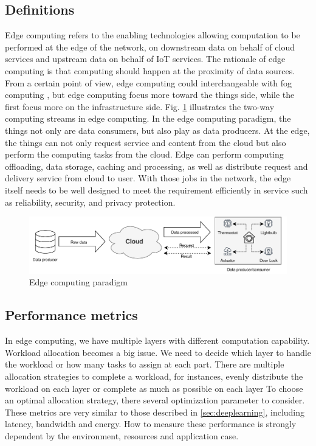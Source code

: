 \subsection{Definitions}
Edge computing refers to the enabling technologies allowing computation to be performed at the edge of the network, on downstream data on behalf of cloud services and upstream data on behalf of IoT services. The rationale of edge computing is that computing should happen at the proximity of data sources. From a certain point of view, edge computing could interchangeable with fog computing \cite{openfog}, but edge computing focus more toward the things side, while the first focus more on the infrastructure side. Fig. \ref{fig:edgearch} illustrates the two-way computing streams in edge computing. In the edge computing paradigm, the things not only are data consumers, but also play as data producers. At the edge, the things can not only request service and content from the cloud but also perform the computing tasks from the cloud. Edge can perform computing offloading, data storage, caching and processing, as well as distribute request and delivery service from cloud to user. With those jobs in the network, the edge itself needs to be well designed to meet the requirement efficiently in service such as reliability, security, and privacy protection.

\begin{figure}
	\includegraphics[width=\linewidth]{images/edgearch}
	\caption{Edge computing paradigm}
	\label{fig:edgearch}
\end{figure}


\subsection{Performance metrics}
In edge computing, we have multiple layers with different computation capability. Workload allocation becomes a big
issue. We need to decide which layer to handle the workload or how many tasks to assign at each part. There are multiple allocation strategies to complete a workload, for instances,
evenly distribute the workload on each layer or complete as much as possible on each layer To choose an optimal allocation strategy, there several optimization parameter to consider. These metrics are very similar to those described in \ref{sec:deeplearning}, including latency, bandwidth and energy. How to measure these performance is strongly dependent by the environment, resources and application case.


